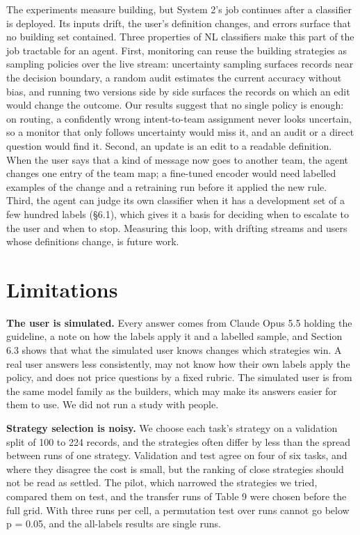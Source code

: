 \documentclass[11pt]{article}
\begin{document}
The experiments measure building, but System 2's job continues after a classifier is deployed. Its inputs drift, the user's definition changes, and errors surface that no building set contained. Three properties of NL classifiers make this part of the job tractable for an agent. First, monitoring can reuse the building strategies as sampling policies over the live stream: uncertainty sampling surfaces records near the decision boundary, a random audit estimates the current accuracy without bias, and running two versions side by side surfaces the records on which an edit would change the outcome. Our results suggest that no single policy is enough: on routing, a confidently wrong intent-to-team assignment never looks uncertain, so a monitor that only follows uncertainty would miss it, and an audit or a direct question would find it. Second, an update is an edit to a readable definition. When the user says that a kind of message now goes to another team, the agent changes one entry of the team map; a fine-tuned encoder would need labelled examples of the change and a retraining run before it applied the new rule. Third, the agent can judge its own classifier when it has a development set of a few hundred labels (\S{}6.1), which gives it a basis for deciding when to escalate to the user and when to stop. Measuring this loop, with drifting streams and users whose definitions change, is future work.

\section*{Limitations}

\textbf{The user is simulated.} Every answer comes from Claude Opus 5.5 holding the guideline, a note on how the labels apply it and a labelled sample, and Section 6.3 shows that what the simulated user knows changes which strategies win. A real user answers less consistently, may not know how their own labels apply the policy, and does not price questions by a fixed rubric. The simulated user is from the same model family as the builders, which may make its answers easier for them to use. We did not run a study with people.

\textbf{Strategy selection is noisy.} We choose each task's strategy on a validation split of 100 to 224 records, and the strategies often differ by less than the spread between runs of one strategy. Validation and test agree on four of six tasks, and where they disagree the cost is small, but the ranking of close strategies should not be read as settled. The pilot, which narrowed the strategies we tried, compared them on test, and the transfer runs of Table 9 were chosen before the full grid. With three runs per cell, a permutation test over runs cannot go below p = 0.05, and the all-labels results are single runs.
\end{document}
